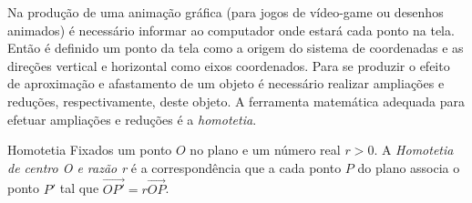 \label{\detokenize{GE101-1A:explorando-operacoes-com-coordenadas}}\label{\detokenize{GE101-1A::doc}}
Na produção de uma animação gráfica (para jogos de vídeo-game ou desenhos animados) é necessário informar ao computador onde estará cada ponto na tela.
Então é definido um ponto da tela como a origem do sistema de coordenadas e as direções vertical e horizontal como eixos coordenados.
Para se produzir o efeito de aproximação e afastamento de um objeto é necessário realizar ampliações e reduções, respectivamente, deste objeto.
A ferramenta matemática adequada para efetuar ampliações e reduções é a \textit{homotetia}.
\begin{observationtitle}{Homotetia}
Fixados um ponto \(O\) no plano e um número real \(r>0\). A \textit{Homotetia de centro O  e razão r} é a correspondência que a cada ponto \(P\) do plano associa o ponto \(P'\) tal que \(\overrightarrow{OP'}=r\overrightarrow{OP}\).
\end{observationtitle}

